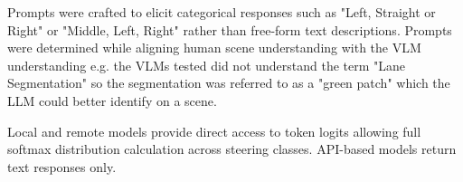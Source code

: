 Prompts were crafted to elicit categorical responses such as  "Left, Straight or Right" or "Middle, Left, Right" rather than free-form text descriptions. Prompts were determined while aligning human scene understanding with the VLM understanding e.g. the VLMs tested did not understand the term "Lane Segmentation" so the segmentation was referred to as a "green patch" which the LLM could better identify on a scene.

Local and remote models provide direct access to token logits allowing full softmax distribution calculation across steering classes. API-based models return text responses only.
